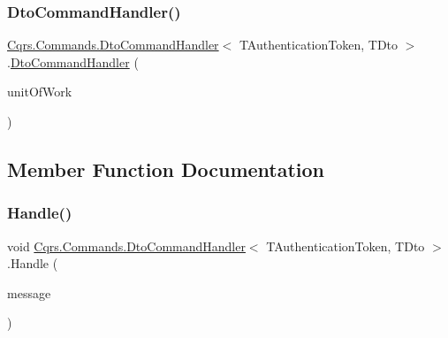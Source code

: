 \subsubsection{\texorpdfstring{Dto\+Command\+Handler()}{DtoCommandHandler()}}
{\footnotesize\ttfamily \hyperlink{classCqrs_1_1Commands_1_1DtoCommandHandler}{Cqrs.\+Commands.\+Dto\+Command\+Handler}$<$ T\+Authentication\+Token, T\+Dto $>$.\hyperlink{classCqrs_1_1Commands_1_1DtoCommandHandler}{Dto\+Command\+Handler} (\begin{DoxyParamCaption}\item[{\hyperlink{interfaceCqrs_1_1Domain_1_1IUnitOfWork}{I\+Unit\+Of\+Work}$<$ T\+Authentication\+Token $>$}]{unit\+Of\+Work }\end{DoxyParamCaption})}



\subsection{Member Function Documentation}
\mbox{\label{classCqrs_1_1Commands_1_1DtoCommandHandler_a344c5d909b31fe7ad6b81c69ab569fc8}} 
\subsubsection{\texorpdfstring{Handle()}{Handle()}}
{\footnotesize\ttfamily void \hyperlink{classCqrs_1_1Commands_1_1DtoCommandHandler}{Cqrs.\+Commands.\+Dto\+Command\+Handler}$<$ T\+Authentication\+Token, T\+Dto $>$.Handle (\begin{DoxyParamCaption}\item[{\hyperlink{classCqrs_1_1Commands_1_1DtoCommand}{Dto\+Command}$<$ T\+Authentication\+Token, T\+Dto $>$}]{message }\end{DoxyParamCaption})}

